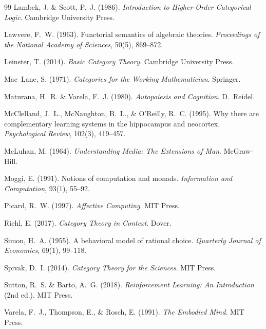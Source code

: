 \documentclass[11pt,a4paper]{article}
\begin{document}
\begin{thebibliography}{99}
Lambek, J. \& Scott, P.~J. (1986).
\newblock \emph{Introduction to Higher-Order Categorical Logic}.
\newblock Cambridge University Press.

Lawvere, F.~W. (1963).
\newblock Functorial semantics of algebraic theories.
\newblock \emph{Proceedings of the National Academy of Sciences}, 50(5), 869--872.

Leinster, T. (2014).
\newblock \emph{Basic Category Theory}.
\newblock Cambridge University Press.

Mac~Lane, S. (1971).
\newblock \emph{Categories for the Working Mathematician}.
\newblock Springer.

Maturana, H.~R. \& Varela, F.~J. (1980).
\newblock \emph{Autopoiesis and Cognition}.
\newblock D.~Reidel.

McClelland, J.~L., McNaughton, B.~L., \& O'Reilly, R.~C. (1995).
\newblock Why there are complementary learning systems in the hippocampus and neocortex.
\newblock \emph{Psychological Review}, 102(3), 419--457.

McLuhan, M. (1964).
\newblock \emph{Understanding Media: The Extensions of Man}.
\newblock McGraw-Hill.

Moggi, E. (1991).
\newblock Notions of computation and monads.
\newblock \emph{Information and Computation}, 93(1), 55--92.

Picard, R.~W. (1997).
\newblock \emph{Affective Computing}.
\newblock MIT Press.

Riehl, E. (2017).
\newblock \emph{Category Theory in Context}.
\newblock Dover.

Simon, H.~A. (1955).
\newblock A behavioral model of rational choice.
\newblock \emph{Quarterly Journal of Economics}, 69(1), 99--118.

Spivak, D.~I. (2014).
\newblock \emph{Category Theory for the Sciences}.
\newblock MIT Press.

Sutton, R.~S. \& Barto, A.~G. (2018).
\newblock \emph{Reinforcement Learning: An Introduction} (2nd ed.).
\newblock MIT Press.

Varela, F.~J., Thompson, E., \& Rosch, E. (1991).
\newblock \emph{The Embodied Mind}.
\newblock MIT Press.


\end{thebibliography}
\end{document}
